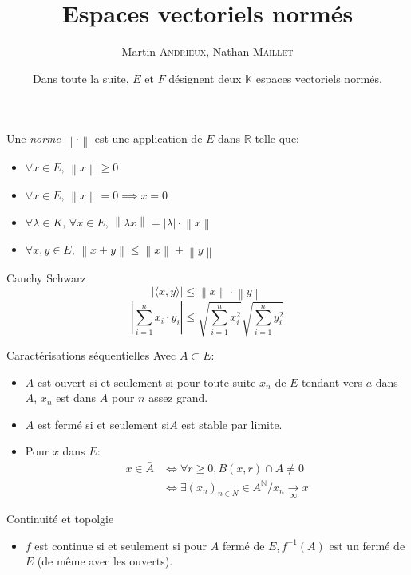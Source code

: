 \documentclass[french, a4paper, 11pt, twocolumn]{article}
\title{Espaces vectoriels normés}
\author{Martin \textsc{Andrieux}, Nathan \textsc{Maillet}}
\date{Dans toute la suite, \(E\) et \(F\) désignent deux \(\mathbb{K}\) espaces vectoriels normés.}
\newcommand{\ssi}{si et seulement si\xspace}		%
\newcommand{\norme}[1]{\left\| #1\right\|}
\newcommand{\abs}[1]{\left\lvert #1\right\rvert}
\newcommand{\limit}[1]{\underset{#1}{\rightarrow}}  %
\newcommand{\N}{\mathbb{N}}   %
\newcommand{\R}{\mathbb{R}}   %
\begin{document}
\maketitle

\begin{definition}
  Une \emph{norme} \(\norme{\cdot}\) est une application de \(E\) dans \(\R\) telle que:
  \begin{itemize}[label=\(\bullet\)]
    \item \(\forall x\in E,\,\norme{x}\geqslant 0\)
    \item \(\forall x\in E,\,\norme{x}=0\implies x=0\)
    \item \(\forall\lambda\in K,\,\forall x\in E,\, \norme{\lambda x}=\abs{\lambda} \cdot \norme{x}\)
    \item \(\forall x,y\in E,\, \norme{x+y}\leqslant\norme{x}+\norme{y}\)
  \end{itemize}
\end{definition}

\begin{theoreme}{Cauchy Schwarz}
  \[\left\lvert \langle x,y\rangle\right\rvert\leqslant\norme{x}\cdot\norme{y}\]
  \tcblower
  \[\abs{\sum_{i=1}^n x_{i}\cdot y_{i}}\leqslant \sqrt{\sum_{i=1}^n x_{i}^{2}}\sqrt{\sum_{i=1}^n y_{i}^{2}}\]
\end{theoreme}

\begin{theoreme}{Caractérisations séquentielles}
    Avec \(A \subset E\):
    \begin{itemize}[label=\(\bullet\)]
        \item \(A\) est ouvert \ssi pour toute suite \(x_{n}\) de \(E\) tendant vers \(a\) dans \(A\), \(x_{n}\) est dans \(A\) pour \(n\) assez grand.
        \item \(A\) est fermé \ssi \(A\) est stable par limite.
        \item Pour \(x\) dans \(E\):
        \begin{align*} 
            x \in \bar{A} & \iff \forall r \geq 0, B(x,r) \cap A \neq 0 \\
                          & \iff \exists {(x_n)}_{n\in N} \in A^{\N} / x_n \limit{\infty} x
        \end{align*}
    \end{itemize}
\end{theoreme}

\begin{theoreme}{Continuité et topolgie}
    \begin{itemize}[label=\(\bullet\)]
        \item \(f\) est continue \ssi pour \(A\) fermé de \(E\),\(\, f^{-1}(A)\) est un fermé de \(E\) (de même avec les ouverts).
    \end{itemize}
\end{theoreme}
\end{document}
